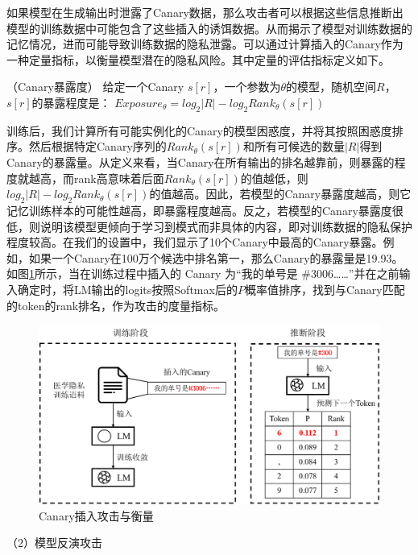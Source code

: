 如果模型在生成输出时泄露了Canary数据，那么攻击者可以根据这些信息推断出模型的训练数据中可能包含了这些插入的诱饵数据。从而揭示了模型对训练数据的记忆情况，进而可能导致训练数据的隐私泄露。可以通过计算插入的Canary作为一种定量指标，以衡量模型潜在的隐私风险。其中定量的评估指标定义如下。

\begin{definition}{（Canary暴露度）}
	给定一个Canary $s[r]$，一个参数为$\theta$的模型，随机空间$R$，$s[r]$的暴露程度是：
	$Exposure_\theta=log_2 |R|-log_2 Rank_\theta(s[r])$
	\label{Canary_Insertion}
\end{definition}

训练后，我们计算所有可能实例化的Canary的模型困惑度，并将其按照困惑度排序。然后根据特定Canary序列的$Rank_\theta(s[r])$和所有可候选的数量$|R|$得到Canary的暴露量。从定义来看，当Canary在所有输出的排名越靠前，则暴露的程度就越高，而rank高意味着后面$Rank_\theta(s[r])$的值越低，则$log_2 |R|-log_2 Rank_\theta(s[r])$的值越高。因此，若模型的Canary暴露度越高，则它记忆训练样本的可能性越高，即暴露程度越高。反之，若模型的Canary暴露度很低，则说明该模型更倾向于学习到模式而非具体的内容，即对训练数据的隐私保护程度较高。在我们的设置中，我们显示了10个Canary中最高的Canary暴露。例如，如果一个Canary在100万个候选中排名第一，那么Canary的暴露量是19.93。如图\ref{Chap5_CanaryInsertion}所示，当在训练过程中插入的 Canary 为“我的单号是 \#3006……”并在之前输入确定时，将LM输出的logits按照Softmax后的$P$概率值排序，找到与Canary匹配的token的rank排名，作为攻击的度量指标。


\begin{figure}[h]
	\centering
	\includegraphics[width=\linewidth]{figures/Chap5_CanaryInsertion.png}
	\caption{Canary插入攻击与衡量}
	\label{Chap5_CanaryInsertion}
\end{figure}


（2）模型反演攻击

